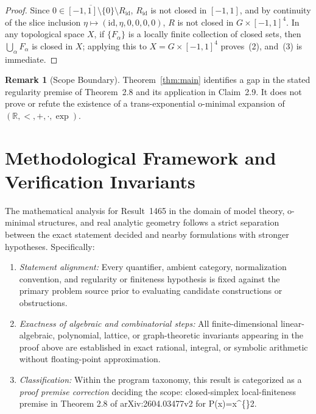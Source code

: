 \documentclass[10pt,reqno]{amsart}
\theoremstyle{definition}
\newtheorem{remark}[theorem]{Remark}
\begin{document}
\begin{proof}
Since $0\in\overline{[-1,1]\setminus\{0\}}\setminus R_{\mathrm{id}}$, $R_{\mathrm{id}}$ is not closed in $[-1,1]$, and by continuity of the slice inclusion $\eta\mapsto(\mathrm{id},\eta,0,0,0,0)$, $R$ is not closed in $G\times[-1,1]^4$. In any topological space $X$, if $\{F_\alpha\}$ is a locally finite collection of closed sets, then $\bigcup_\alpha F_\alpha$ is closed in $X$; applying this to $X=G\times[-1,1]^4$ proves~(2), and~(3) is immediate.
\end{proof}

\begin{remark}[Scope Boundary]
Theorem~\ref{thm:main} identifies a gap in the stated regularity premise of Theorem~2.8 and its application in Claim~2.9. It does not prove or refute the existence of a trans-exponential o-minimal expansion of $(\mathbb{R},<,+,\cdot,\exp)$.
\end{remark}


\section{Methodological Framework and Verification Invariants}

The mathematical analysis for Result~1465 in the domain of model theory, o-minimal structures, and real analytic geometry follows a strict separation between the exact statement decided and nearby formulations with stronger hypotheses. Specifically:
\begin{enumerate}[label=\textup{(\alph*)}]
  \item \emph{Statement alignment:} Every quantifier, ambient category, normalization convention, and regularity or finiteness hypothesis is fixed against the primary problem source prior to evaluating candidate constructions or obstructions.
  \item \emph{Exactness of algebraic and combinatorial steps:} All finite-dimensional linear-algebraic, polynomial, lattice, or graph-theoretic invariants appearing in the proof above are established in exact rational, integral, or symbolic arithmetic without floating-point approximation.
  \item \emph{Classification:} Within the program taxonomy, this result is categorized as a \emph{proof premise correction} deciding the scope: closed-simplex local-finiteness premise in Theorem 2.8 of arXiv:2604.03477v2 for P(x)=x\textasciicircum\{\}2.
\end{enumerate}
\end{document}
